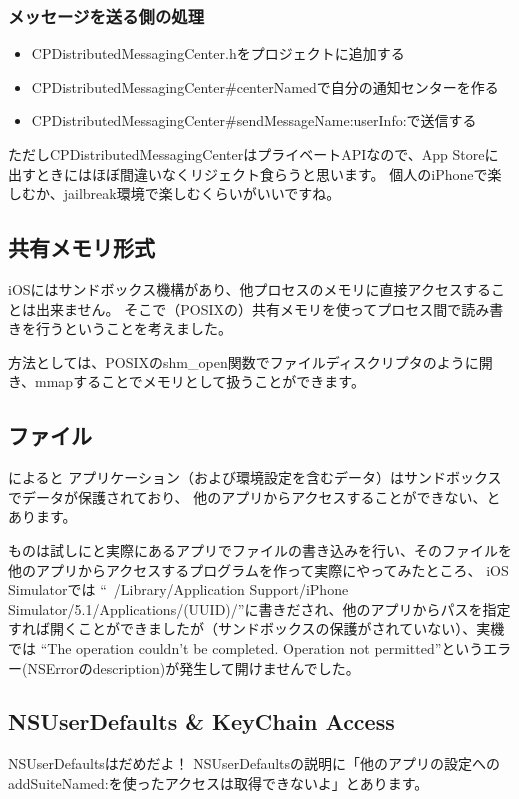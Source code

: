 \documentclass[b5paper]{jsarticle}
\begin{document}
\subsubsection{メッセージを送る側の処理}
\begin{itemize}
  \item CPDistributedMessagingCenter.hをプロジェクトに追加する
  \item CPDistributedMessagingCenter\#centerNamedで自分の通知センターを作る
  \item CPDistributedMessagingCenter\#sendMessageName:userInfo:で送信する
\end{itemize}

ただしCPDistributedMessagingCenterはプライベートAPIなので、App Storeに出すときにはほぼ間違いなくリジェクト食らうと思います。
個人のiPhoneで楽しむか、jailbreak環境で楽しむくらいがいいですね。

\subsection{共有メモリ形式}
iOSにはサンドボックス機構があり、他プロセスのメモリに直接アクセスすることは出来ません。
そこで（POSIXの）共有メモリを使ってプロセス間で読み書きを行うということを考えました。

方法としては、POSIXのshm\_open関数でファイルディスクリプタのように開き、mmapすることでメモリとして扱うことができます。

\subsection{ファイル}
によると
アプリケーション（および環境設定を含むデータ）はサンドボックスでデータが保護されており、
他のアプリからアクセスすることができない、とあります。

ものは試しにと実際にあるアプリでファイルの書き込みを行い、そのファイルを他のアプリからアクセスするプログラムを作って実際にやってみたところ、
iOS Simulatorでは
``~/Library/Application Support/iPhone Simulator/5.1/Applications/(UUID)/''に書きだされ、他のアプリからパスを指定すれば開くことができましたが（サンドボックスの保護がされていない）、実機では
``The operation couldn't be completed. Operation not permitted''というエラー(NSErrorのdescription)が発生して開けませんでした。

\subsection{NSUserDefaults \& KeyChain Access}
NSUserDefaultsはだめだよ！
NSUserDefaultsの説明に「他のアプリの設定へのaddSuiteNamed:を使ったアクセスは取得できないよ」とあります。
\end{document}
